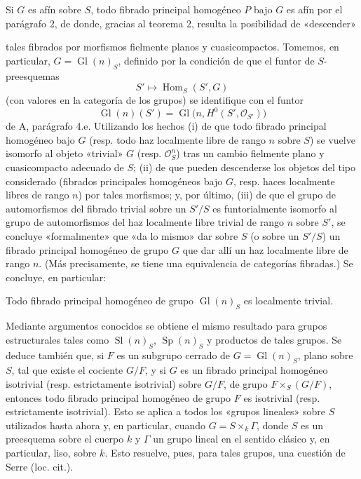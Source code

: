 Si $G$ es afín sobre $S$, todo fibrado principal homogéneo $P$ bajo $G$ es afín
por el parágrafo 2, de donde, gracias al teorema 2, resulta la posibilidad de
«descender»

tales fibrados por morfismos fielmente planos y cuasicompactos. Tomemos, en
particular, $G=\operatorname{Gl}(n)_S$, definido por la condición de que el
funtor de $S$-preesquemas
\[
  S'\longmapsto\operatorname{Hom}_S(S',G)
\]
(con valores en la categoría de los grupos) se identifique con el funtor
\[
  \operatorname{Gl}(n)(S')
  =\operatorname{Gl}\bigl(n,H^0(S',\mathcal O_{S'})\bigr)
\]
de A, parágrafo 4.e. Utilizando los hechos (i) de que todo fibrado principal
homogéneo bajo $G$ (resp. todo haz localmente libre de rango $n$ sobre $S$) se
vuelve isomorfo al objeto «trivial» $G$ (resp. $\mathcal O_S^n$) tras un cambio
fielmente plano y cuasicompacto adecuado de $S$; (ii) de que pueden descenderse
los objetos del tipo considerado (fibrados principales homogéneos bajo $G$,
resp. haces localmente libres de rango $n$) por tales morfismos; y, por último,
(iii) de que el grupo de automorfismos del fibrado trivial sobre un $S'/S$ es
funtorialmente isomorfo al grupo de automorfismos del haz localmente libre
trivial de rango $n$ sobre $S'$, se concluye «formalmente» que «da lo mismo»
dar sobre $S$ (o sobre un $S'/S$) un fibrado principal homogéneo de grupo $G$
que dar allí un haz localmente libre de rango $n$. (Más precisamente, se tiene
una equivalencia de categorías fibradas.) Se concluye, en particular:

 Todo fibrado principal homogéneo de grupo
$\operatorname{Gl}(n)_S$ es localmente trivial.

Mediante argumentos conocidos se obtiene el mismo resultado para grupos
estructurales tales como $\operatorname{Sl}(n)_S$, $\operatorname{Sp}(n)_S$ y
productos de tales grupos. Se deduce también que, si $F$ es un subgrupo cerrado
de $G=\operatorname{Gl}(n)_S$, plano sobre $S$, tal que existe el cociente
$G/F$, y si $G$ es un fibrado principal homogéneo isotrivial (resp.
estrictamente isotrivial) sobre $G/F$, de grupo $F\times_S(G/F)$, entonces todo
fibrado principal homogéneo de grupo $F$ es isotrivial (resp. estrictamente
isotrivial). Esto se aplica a todos los «grupos lineales» sobre $S$ utilizados
hasta ahora y, en particular, cuando $G=S\times_k\Gamma$, donde $S$ es un
preesquema sobre el cuerpo $k$ y $\Gamma$ un grupo lineal en el sentido clásico
y, en particular, liso, sobre $k$. Esto resuelve, pues, para tales grupos, una
cuestión de Serre (loc. cit.).

